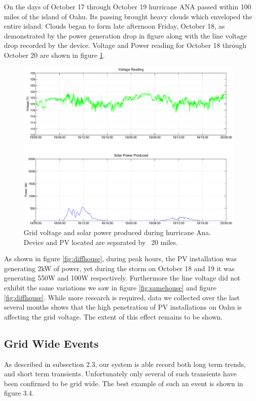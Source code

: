 On the days of October 17 through October 19 hurricane ANA passed within 100 miles of the island of Oahu. Its passing brought heavy clouds which enveloped the entire island. Clouds began to form 
late afternoon Friday, October 18, as demonstrated by the power generation drop in figure  along with the line voltage drop recorded by the device. Voltage and Power reading for
October 18 through October 20 are shown in figure \ref{fig:storm}.

\begin{figure}[h!]
\centering
\includegraphics[width=\textwidth]{img/Stormy.eps}
\caption{Grid voltage and solar power produced during hurricane Ana. Device and PV located are separated by ~20 miles.}
\label{fig:storm}
\end{figure} 

As shown in figure \ref{fig:diffhouse}, during peak hours, the PV installation  was generating 2kW of power, yet during the storm on October 18 and 19 it was generating 550W and 100W respectively. Furthermore
the line voltage did not exhibit the same variations we saw in figure \ref{fig:samehouse} and figure \ref{fig:diffhouse}. While more research is required, data we collected over the last several months shows that the
high penetration of PV installations on Oahu is affecting the grid voltage. The extent of this effect remains to be shown.

\subsection{Grid Wide Events}

As described in subsection 2.3, our system is able record both long term trends, and short term transients. Unfortunately only several of such transients have been confirmed to be grid wide.
The best example of such an event is shown in figure 3.4.

